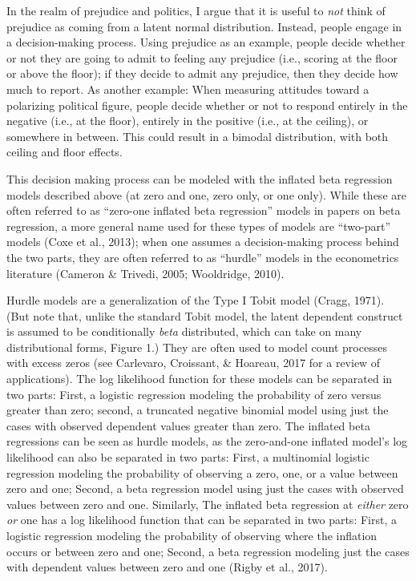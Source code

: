 \documentclass[english,man]{apa6}
\theoremstyle{definition}
\theoremstyle{definition}
\theoremstyle{remark}
\begin{document}
In the realm of prejudice and politics, I argue that it is useful to
\emph{not} think of prejudice as coming from a latent normal
distribution. Instead, people engage in a decision-making process. Using
prejudice as an example, people decide whether or not they are going to
admit to feeling any prejudice (i.e., scoring at the floor or above the
floor); if they decide to admit any prejudice, then they decide how much
to report. As another example: When measuring attitudes toward a
polarizing political figure, people decide whether or not to respond
entirely in the negative (i.e., at the floor), entirely in the positive
(i.e., at the ceiling), or somewhere in between. This could result in a
bimodal distribution, with both ceiling and floor effects.

This decision making process can be modeled with the inflated beta
regression models described above (at zero and one, zero only, or one
only). While these are often referred to as \enquote{zero-one inflated
beta regression} models in papers on beta regression, a more general
name used for these types of models are \enquote{two-part} models (Coxe
et al., 2013); when one assumes a decision-making process behind the two
parts, they are often referred to as \enquote{hurdle} models in the
econometrics literature (Cameron \& Trivedi, 2005; Wooldridge, 2010).

Hurdle models are a generalization of the Type I Tobit model (Cragg,
1971). (But note that, unlike the standard Tobit model, the latent
dependent construct is assumed to be conditionally \emph{beta}
distributed, which can take on many distributional forms, Figure 1.)
They are often used to model count processes with excess zeros (see
Carlevaro, Croissant, \& Hoareau, 2017 for a review of applications).
The log likelihood function for these models can be separated in two
parts: First, a logistic regression modeling the probability of zero
versus greater than zero; second, a truncated negative binomial model
using just the cases with observed dependent values greater than zero.
The inflated beta regressions can be seen as hurdle models, as the
zero-and-one inflated model's log likelihood can also be separated in
two parts: First, a multinomial logistic regression modeling the
probability of observing a zero, one, or a value between zero and one;
Second, a beta regression model using just the cases with observed
values between zero and one. Similarly, The inflated beta regression at
\emph{either} zero \emph{or} one has a log likelihood function that can
be separated in two parts: First, a logistic regression modeling the
probability of observing where the inflation occurs or between zero and
one; Second, a beta regression modeling just the cases with dependent
values between zero and one (Rigby et al., 2017).
\end{document}
